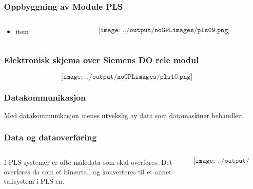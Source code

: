 \documentclass[aspectratio=169,xcolor=dvipsnames]{beamer}
\begin{document}
\begin{frame}
	\frametitle{Oppbyggning av Module PLS}
	\begin{columns}
		\begin{column}{0.5\textwidth}
			\begin{itemize}
				\item item
			\end{itemize}

			
		\end{column}

		\begin{column}{0.5\textwidth}
	$$\texttt{[image: ../output/noGPLimages/pls09.png]}$$
		\end{column}
	\end{columns}
\end{frame}

\begin{frame}
	\frametitle{Elektronisk skjema over Siemens DO rele modul}
	$$\texttt{[image: ../output/noGPLimages/pls10.png]}$$
\end{frame}
\begin{frame}
	\frametitle{Datakommunikasjon}
Med datakommunikasjon menes utvekslig av data som datamaskiner behandler. 
\end{frame}




\begin{frame}
	\frametitle{Data og dataoverføring}
	\begin{columns}
		\begin{column}{0.5\textwidth}
I PLS systemer er ofte måledata som skal overføres. Det overføres da som et binærtall og konverteres til et annet tallsystem i PLS-en. 

			
		\end{column}

		\begin{column}{0.5\textwidth}
	$$\texttt{[image: ../output/noGPLimages/kap5x01]}$$
		\end{column}
	\end{columns}
\end{frame}
\end{document}
